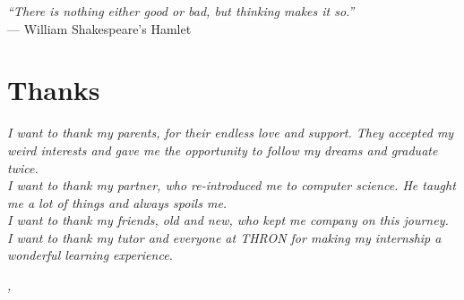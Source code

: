 
\cleardoublepage
{}
{}

\begin{flushright}{
	\slshape    
	``There is nothing either good or bad, but thinking makes it so.'' \medskip} \\ 
	\medskip
    --- William Shakespeare's Hamlet
\end{flushright}


\bigskip

\begingroup
\let\clearpage\relax
\let\cleardoublepage\relax
\let\cleardoublepage\relax

\chapter*{Thanks}

\noindent \textit{I want to thank my parents, for their endless love and support. They accepted my weird interests and gave me the opportunity to follow my dreams and graduate twice.}\\

\noindent \textit{
I want to thank my partner, who re-introduced me to computer science. He taught me a lot of things and always spoils me.}\\

\noindent \textit{I want to thank my friends, old and new, who kept me company on this journey.}\\

\noindent \textit{I want to thank my tutor and everyone at THRON for making my internship a wonderful learning experience.}

\bigskip

\noindent\textit{\myLocation, \myTime}
\hfill \myName

\endgroup

